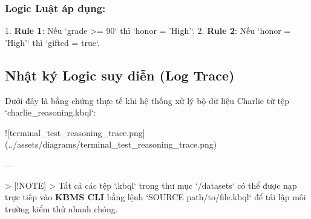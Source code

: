 \subsubsection{Logic Luật áp dụng:}
1.  \textbf{Rule 1}: Nếu `grade >= 90` thì `honor = 'High'`.
2.  \textbf{Rule 2}: Nếu `honor = 'High'` thì `gifted = true`.

\subsection{Nhật ký Logic suy diễn (Log Trace)}

Dưới đây là bằng chứng thực tế khi hệ thống xử lý bộ dữ liệu Charlie từ tệp `charlie\_reasoning.kbql`:

![terminal\_test\_reasoning\_trace.png](../assets/diagrams/terminal\_test\_reasoning\_trace.png)

---

> [!NOTE]
> Tất cả các tệp `.kbql` trong thư mục `/datasets` có thể được nạp trực tiếp vào \textbf{KBMS CLI} bằng lệnh `SOURCE path/to/file.kbql` để tái lập môi trường kiểm thử nhanh chóng.

